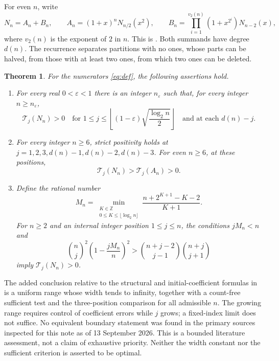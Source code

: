 \documentclass[11pt]{article}
\newtheorem{theorem}{Theorem}
\newcommand{\T}{\mathcal T}
\begin{document}
For even $n$, write
\begin{equation}\label{eq:rec}
 N_n=A_n+B_n,\qquad A_n=(1+x)^nN_{n/2}(x^2),\qquad
 B_n=\prod_{i=1}^{v_2(n)}(1+x^{2^i})N_{n-2}(x),
\end{equation}
where $v_2(n)$ is the exponent of $2$ in $n$.
This is \cite[Theorem 4.7]{BBFM}. Both summands have degree $d(n)$.
The recurrence separates partitions with no ones, whose parts can be
halved, from those with at least two ones, from which two ones can be deleted.

\begin{theorem}\label{thm:main}
For the numerators \eqref{eq:def}, the following assertions hold.
\begin{enumerate}
\item For every real $0<\varepsilon<1$ there is an integer $n_\varepsilon$
such that, for every integer $n\ge n_\varepsilon$,
\[
 \T_j(N_n)>0\quad\text{for }1\le j\le
 \left\lfloor(1-\varepsilon)\sqrt{\frac{\log_2 n}{2}}\right\rfloor
 \quad\text{and at each }d(n)-j.
\]
\item For every integer $n\ge6$, strict positivity holds at
$j=1,2,3,d(n)-1,d(n)-2,d(n)-3$. For even $n\ge6$, at these positions,
\[
 \T_j(N_n)>\T_j(A_n)>0.
\]
\item Define the rational number
\begin{equation}\label{eq:M}
 M_n=\min_{\substack{K\in\mathbb Z\\0\le K\le\lfloor\log_2n\rfloor}}
 \frac{n+2^{K+1}-K-2}{K+1}.
\end{equation}
For $n\ge2$ and an internal integer position $1\le j\le n$, the conditions
$jM_n<n$ and
\begin{equation}\label{eq:test}
 \binom nj^2\left(1-\frac{jM_n}{n}\right)^2>
 \binom{n+j-2}{j-1}\binom{n+j}{j+1}
\end{equation}
imply $\T_j(N_n)>0$.
\end{enumerate}
\end{theorem}

The added conclusion relative to the structural and initial-coefficient
formulas in \cite[Section 4]{BBFM} is a uniform range whose width tends
to infinity, together with a count-free sufficient test and the three-position
comparison for all admissible $n$. The growing range requires control of
coefficient errors while $j$ grows; a fixed-index limit does not suffice.
No equivalent boundary statement was found in the primary sources inspected
for this note as of 13 September 2026. This is a bounded literature assessment,
not a claim of exhaustive priority. Neither the width constant nor the
sufficient criterion is asserted to be optimal.
\end{document}
